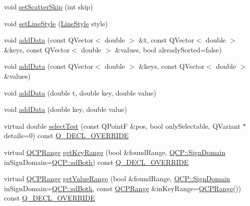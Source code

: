 \begin{DoxyCompactItemize}
\item 
void \hyperlink{class_q_c_p_curve_a97dbfecd497e972d5f2162615e6da5be}{set\+Scatter\+Skip} (int skip)
\item 
void \hyperlink{class_q_c_p_curve_a4a377ec863ff81a1875c3094a6177c19}{set\+Line\+Style} (\hyperlink{class_q_c_p_curve_a2710e9f79302152cff794c6e16cc01f1}{Line\+Style} style)
\item 
void \hyperlink{class_q_c_p_curve_a73edf394b94f3f24f07518e30565a07f}{add\+Data} (const Q\+Vector$<$ double $>$ \&t, const Q\+Vector$<$ double $>$ \&keys, const Q\+Vector$<$ double $>$ \&values, bool already\+Sorted=false)
\item 
void \hyperlink{class_q_c_p_curve_a6424fa06da1786648c83ad13a0d0aa14}{add\+Data} (const Q\+Vector$<$ double $>$ \&keys, const Q\+Vector$<$ double $>$ \&values)
\item 
void \hyperlink{class_q_c_p_curve_a13398b236f6926014e404eeb5b9f415c}{add\+Data} (double t, double key, double value)
\item 
void \hyperlink{class_q_c_p_curve_ada4762e793cd5707b33f35b8a4b0f8fb}{add\+Data} (double key, double value)
\item 
virtual double \hyperlink{class_q_c_p_curve_a0ed9b7e6b4bc72010d6fcd974af46a8b}{select\+Test} (const Q\+PointF \&pos, bool only\+Selectable, Q\+Variant $\ast$details=0) const \hyperlink{qcustomplot_8h_a42cc5eaeb25b85f8b52d2a4b94c56f55}{Q\+\_\+\+D\+E\+C\+L\+\_\+\+O\+V\+E\+R\+R\+I\+DE}
\item 
virtual \hyperlink{class_q_c_p_range}{Q\+C\+P\+Range} \hyperlink{class_q_c_p_curve_a22d09087f78f254731197cc0b8783299}{get\+Key\+Range} (bool \&found\+Range, \hyperlink{namespace_q_c_p_afd50e7cf431af385614987d8553ff8a9}{Q\+C\+P\+::\+Sign\+Domain} in\+Sign\+Domain=\hyperlink{namespace_q_c_p_afd50e7cf431af385614987d8553ff8a9aa38352ef02d51ddfa4399d9551566e24}{Q\+C\+P\+::sd\+Both}) const \hyperlink{qcustomplot_8h_a42cc5eaeb25b85f8b52d2a4b94c56f55}{Q\+\_\+\+D\+E\+C\+L\+\_\+\+O\+V\+E\+R\+R\+I\+DE}
\item 
virtual \hyperlink{class_q_c_p_range}{Q\+C\+P\+Range} \hyperlink{class_q_c_p_curve_a8bb8e3b9085f15921dc40483fb025ab2}{get\+Value\+Range} (bool \&found\+Range, \hyperlink{namespace_q_c_p_afd50e7cf431af385614987d8553ff8a9}{Q\+C\+P\+::\+Sign\+Domain} in\+Sign\+Domain=\hyperlink{namespace_q_c_p_afd50e7cf431af385614987d8553ff8a9aa38352ef02d51ddfa4399d9551566e24}{Q\+C\+P\+::sd\+Both}, const \hyperlink{class_q_c_p_range}{Q\+C\+P\+Range} \&in\+Key\+Range=\hyperlink{class_q_c_p_range}{Q\+C\+P\+Range}()) const \hyperlink{qcustomplot_8h_a42cc5eaeb25b85f8b52d2a4b94c56f55}{Q\+\_\+\+D\+E\+C\+L\+\_\+\+O\+V\+E\+R\+R\+I\+DE}
\end{DoxyCompactItemize}
